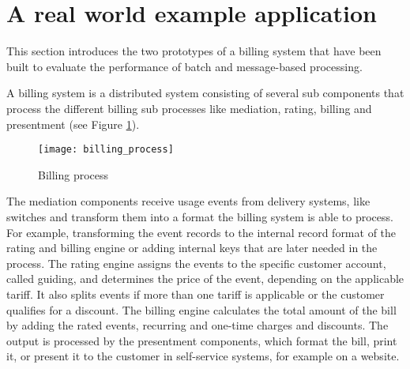 \section{A real world example  application}\label{sec:ch4_prototype}
This section introduces the two prototypes of a billing system that have been built to evaluate the performance of batch and message-based processing.

A billing system is a distributed system consisting of several sub components that process the different billing sub processes like mediation, rating, billing and presentment (see Figure \ref{fig:ch4_billing_process}).

\begin{figure}[h!]
	\centering
	\texttt{[image: billing\_process]}
	\caption{Billing process}
	\label{fig:ch4_billing_process}
\end{figure}

The mediation components receive usage events from delivery systems, like switches and transform them into a format the billing system is able to process. For example, transforming the event records to the internal record format of the rating and billing engine or adding internal keys that are later needed in the process. The rating engine assigns the events to the specific customer account, called guiding, and determines the price of the event, depending on the applicable tariff. It also splits events if more than one tariff is applicable or the customer qualifies for a discount. The billing engine calculates the total amount of the bill by adding the rated events, recurring and one-time charges and discounts. The output is processed by the presentment components, which format the bill, print it, or present it to the customer in self-service systems, for example on a website.


